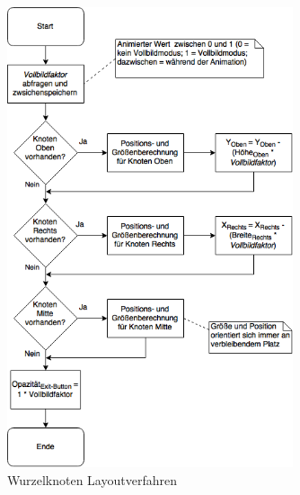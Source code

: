\begin{figure}[H]
 \centering
 \includegraphics[width=0.75\textwidth]{grafiken/root_node_layout.png}
 \caption{Wurzelknoten Layoutverfahren}
 \label{fig:rootNodeLayout}
\end{figure}
